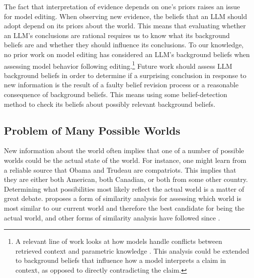 \documentclass[11pt,a4paper]{article}
\begin{document}
The fact that interpretation of evidence depends on one's priors raises an issue for model editing. When observing new evidence, the beliefs that an LLM should adopt depend on its priors about the world. 
This means that evaluating whether an LLM's conclusions are rational requires us to know what its background beliefs are and whether they should influence its conclusions. 
To our knowledge, no prior work on model editing has considered an LLM's background beliefs when assessing model behavior following editing.\footnote{A relevant line of work looks at how models handle conflicts between retrieved context and parametric knowledge \citep{longpre2021entity, wang2023resolving, xie2023adaptive, du2024context}. This analysis could be extended to background beliefs that influence how a model interprets a claim in context, as opposed to directly contradicting the claim.}
Future work should assess LLM background beliefs in order to determine if a surprising conclusion in response to new information is the result of a faulty belief revision process or a reasonable consequence of background beliefs. This means using some belief-detection method \cite[e.g. prompting or probing; see][]{hofweber2024language} to check its beliefs about possibly relevant background beliefs.

\subsection{Problem of Many Possible Worlds}
\label{sec:problem_of_possible_worlds}

New information about the world often implies that one of a number of possible worlds could be the actual state of the world. For instance, one might learn from a reliable source that Obama and Trudeau are compatriots. This implies that they are either both American, both Canadian, or both from some other country. Determining what possibilities most likely reflect the actual world is a matter of great debate.
\citet{lewis1979counterfactual} proposes a form of similarity analysis for assessing which world is most similar to our current world and therefore the best candidate for being the actual world, and other forms of similarity analysis have followed since \citep{sep-counterfactuals}. 
\end{document}
